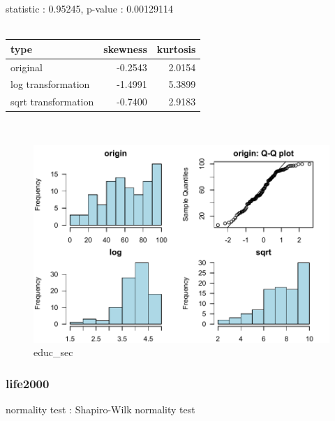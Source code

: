 \documentclass{book}\usepackage[]{graphicx}\usepackage[]{color}
\begin{document}
\noindent statistic : 0.95245,  p-value : 0.00129114\\
\\%
\begin{tabular}{lrr}
  \toprule
type & skewness & kurtosis \\ 
  \midrule
original & -0.2543 & 2.0154 \\ 
  log transformation & -1.4991 & 5.3899 \\ 
  sqrt transformation & -0.7400 & 2.9183 \\ 
   \bottomrule
\end{tabular}
\\
\begin{figure}[!ht]
\centering
\includegraphics[width=1.0\textwidth]{figure/norm8.pdf}
\caption{educ\_sec}
\end{figure}
\clearpage
\subsubsection{ life2000 }

normality test : Shapiro-Wilk normality test
\end{document}
